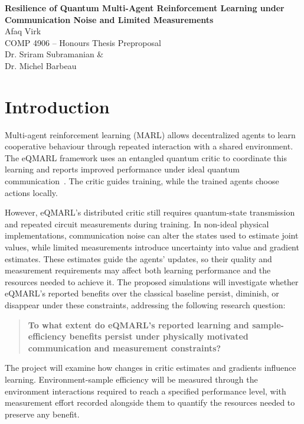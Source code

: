 \documentclass[12pt]{article}
\newcommand{\projecttitle}{Resilience of Quantum Multi-Agent Reinforcement Learning under Communication Noise and Limited Measurements}
\begin{document}
\begin{flushright}
    {\Large\bfseries \projecttitle}\\[3pt]
    Afaq Virk\\[-1pt]
    COMP 4906 -- Honours Thesis Preproposal\\[-1pt]
    Dr. Sriram Subramanian \&\\[-1pt]
    Dr. Michel Barbeau
\end{flushright}

\vspace{-4pt}

\section{Introduction}

Multi-agent reinforcement learning (MARL) allows decentralized agents to learn cooperative behaviour through repeated interaction with a shared environment. The eQMARL framework uses an entangled quantum critic to coordinate this learning and reports improved performance under ideal quantum communication~\cite{eqmarl}. The critic guides training, while the trained agents choose actions locally.

However, eQMARL's distributed critic still requires quantum-state transmission and repeated circuit measurements during training. In non-ideal physical implementations, communication noise can alter the states used to estimate joint values, while limited measurements introduce uncertainty into value and gradient estimates. These estimates guide the agents' updates, so their quality and measurement requirements may affect both learning performance and the resources needed to achieve it. The proposed simulations will investigate whether eQMARL’s reported benefits over the classical baseline persist, diminish, or disappear under these constraints, addressing the following research question:

\begin{quote}
\textbf{To what extent do eQMARL's reported learning and sample-efficiency benefits persist under physically motivated communication and measurement constraints?}
\end{quote}

The project will examine how changes in critic estimates and gradients influence learning. Environment-sample efficiency will be measured through the environment interactions required to reach a specified performance level, with measurement effort recorded alongside them to quantify the resources needed to preserve any benefit.
\end{document}
